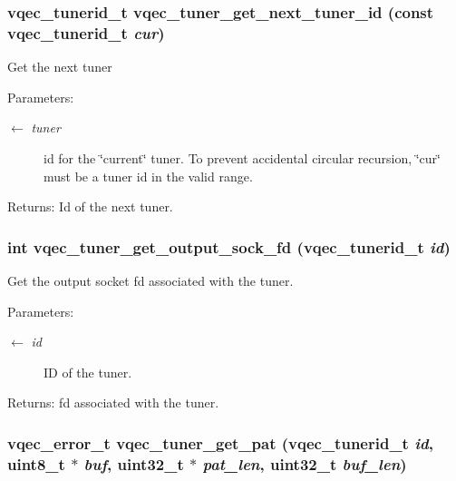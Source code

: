 \subsubsection{\setlength{\rightskip}{0pt plus 5cm}vqec\_\-tunerid\_\-t vqec\_\-tuner\_\-get\_\-next\_\-tuner\_\-id (const vqec\_\-tunerid\_\-t {\em cur})}\label{vqec__tuner_8h_c34377a31d44efe0b16a3599a6190213}


Get the next tuner \begin{Desc}
\item[Parameters:]
\begin{description}
\item[\mbox{$\leftarrow$} {\em tuner}]id for the \char`\"{}current\char`\"{} tuner. To prevent accidental circular recursion, \char`\"{}cur\char`\"{} must be a tuner id in the valid range. \end{description}
\end{Desc}
\begin{Desc}
\item[Returns:]Id of the next tuner. \end{Desc}
\subsubsection{\setlength{\rightskip}{0pt plus 5cm}int vqec\_\-tuner\_\-get\_\-output\_\-sock\_\-fd (vqec\_\-tunerid\_\-t {\em id})}\label{vqec__tuner_8h_3cb320aedfac98ff1b82a22066a228bc}


Get the output socket fd associated with the tuner.

\begin{Desc}
\item[Parameters:]
\begin{description}
\item[\mbox{$\leftarrow$} {\em id}]ID of the tuner. \end{description}
\end{Desc}
\begin{Desc}
\item[Returns:]fd associated with the tuner. \end{Desc}
\subsubsection{\setlength{\rightskip}{0pt plus 5cm}vqec\_\-error\_\-t vqec\_\-tuner\_\-get\_\-pat (vqec\_\-tunerid\_\-t {\em id}, uint8\_\-t $\ast$ {\em buf}, uint32\_\-t $\ast$ {\em pat\_\-len}, uint32\_\-t {\em buf\_\-len})}\label{vqec__tuner_8h_dfff781bdd37cab5ca561ee04cd89998}


